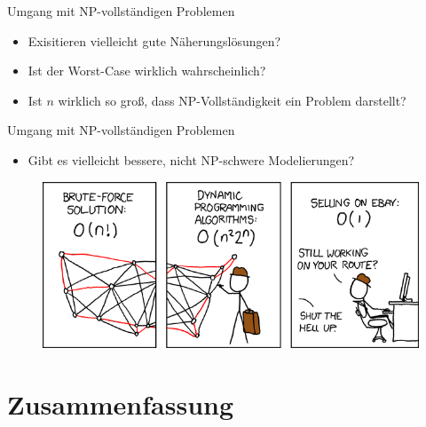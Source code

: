 \documentclass[ignorenonframetext,]{beamer}
\begin{document}
\begin{frame}{Umgang mit NP-vollständigen Problemen}

\begin{itemize}
\itemsep1pt\parskip0pt
\item
  Exisitieren vielleicht gute Näherungslösungen?
\item
  Ist der Worst-Case wirklich wahrscheinlich?
\item
  Ist $n$ wirklich so groß, dass NP-Vollständigkeit ein Problem
  darstellt?
\end{itemize}

\end{frame}

\begin{frame}{Umgang mit NP-vollständigen Problemen}

\begin{itemize}
\itemsep1pt\parskip0pt
\item
  Gibt es vielleicht bessere, nicht NP-schwere Modelierungen?
\end{itemize}

\begin{figure}[htbp]
\centering
\includegraphics{img/travelling_salesman_problem.png}
\end{figure}

\end{frame}

\section{Zusammenfassung}\label{zusammenfassung}
\end{document}
